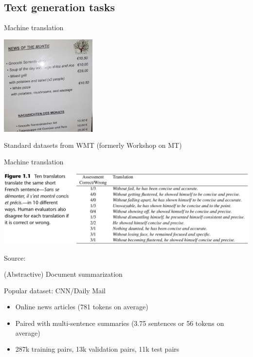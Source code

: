 \documentclass[12pt,aspectratio=169,handout]{beamer}
\begin{document}
\subsection{Text generation tasks}


\begin{frame}{Machine translation}

\includegraphics[width=13em]{img/mtex.jpg}

Standard datasets from WMT (formerly Workshop on MT)



\end{frame}


\begin{frame}{Machine translation}
	

\includegraphics[width=15cm]{img/mt2.png}
	
	
Source: 
	
\end{frame}


\begin{frame}{(Abstractive) Document summarization}

Popular dataset: CNN/Daily Mail

\begin{itemize}
	\item Online news articles (781 tokens on average)
	\item Paired with multi-sentence summaries (3.75 sentences or 56 tokens on average)
	\item 287k training pairs, 13k validation pairs, 11k test pairs
\end{itemize}


\end{frame}
\end{document}
